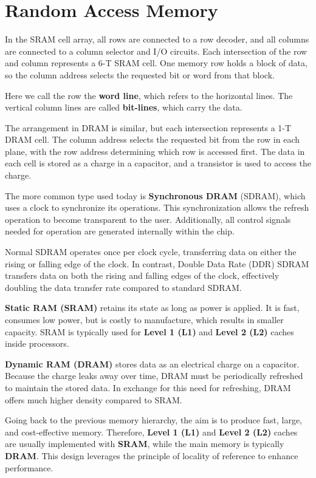 \section{Random Access Memory}
In the SRAM cell array, all rows are connected to a row decoder, and all columns are connected to a column selector and I/O circuits. Each intersection of the row and column represents a 6-T SRAM cell. One memory row holds a block of data, so the column address selects the requested bit or word from that block.

Here we call the row the \textbf{word line}, which refers to the horizontal lines. The vertical column lines are called \textbf{bit-lines}, which carry the data.

The arrangement in DRAM is similar, but each intersection represents a 1-T DRAM cell. The column address selects the requested bit from the row in each plane, with the row address determining which row is accessed first. The data in each cell is stored as a charge in a capacitor, and a transistor is used to access the charge.

The more common type used today is \textbf{Synchronous DRAM} (SDRAM), which uses a clock to synchronize its operations. This synchronization allows the refresh operation to become transparent to the user. Additionally, all control signals needed for operation are generated internally within the chip.

Normal SDRAM operates once per clock cycle, transferring data on either the rising or falling edge of the clock. In contrast, Double Data Rate (DDR) SDRAM transfers data on both the rising and falling edges of the clock, effectively doubling the data transfer rate compared to standard SDRAM.

\textbf{Static RAM (SRAM)} retains its state as long as power is applied. It is fast, consumes low power, but is costly to manufacture, which results in smaller capacity. SRAM is typically used for \textbf{Level 1 (L1)} and \textbf{Level 2 (L2)} caches inside processors.

\textbf{Dynamic RAM (DRAM)} stores data as an electrical charge on a capacitor. Because the charge leaks away over time, DRAM must be periodically refreshed to maintain the stored data. In exchange for this need for refreshing, DRAM offers much higher density compared to SRAM.

Going back to the previous memory hierarchy, the aim is to produce fast, large, and cost-effective memory. Therefore, \textbf{Level 1 (L1)} and \textbf{Level 2 (L2)} caches are usually implemented with \textbf{SRAM}, while the main memory is typically \textbf{DRAM}. This design leverages the principle of locality of reference to enhance performance.

